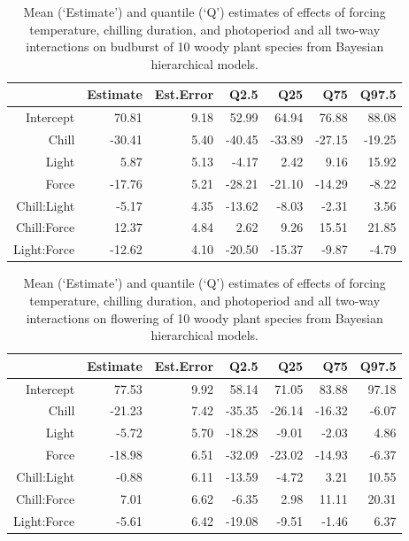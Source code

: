 \documentclass{article}\usepackage[]{graphicx}\usepackage[]{color}
\begin{document}
\begin{table}[ht]
\centering
\begin{tabular}{rrrrrrr}
  \hline
 & Estimate & Est.Error & Q2.5 & Q25 & Q75 & Q97.5 \\ 
  \hline
Intercept & 70.81 & 9.18 & 52.99 & 64.94 & 76.88 & 88.08 \\ 
  Chill & -30.41 & 5.40 & -40.45 & -33.89 & -27.15 & -19.25 \\ 
  Light & 5.87 & 5.13 & -4.17 & 2.42 & 9.16 & 15.92 \\ 
  Force & -17.76 & 5.21 & -28.21 & -21.10 & -14.29 & -8.22 \\ 
  Chill:Light & -5.17 & 4.35 & -13.62 & -8.03 & -2.31 & 3.56 \\ 
  Chill:Force & 12.37 & 4.84 & 2.62 & 9.26 & 15.51 & 21.85 \\ 
  Light:Force & -12.62 & 4.10 & -20.50 & -15.37 & -9.87 & -4.79 \\ 
   \hline
\end{tabular}
\caption{ Mean (`Estimate') and quantile (`Q') estimates of effects of forcing temperature, chilling duration, and photoperiod and all two-way interactions on budburst of 10 woody plant species from Bayesian hierarchical models.} 
\label{tab:modelests}
\end{table}
\begin{table}[ht]
\centering
\begin{tabular}{rrrrrrr}
  \hline
 & Estimate & Est.Error & Q2.5 & Q25 & Q75 & Q97.5 \\ 
  \hline
Intercept & 77.53 & 9.92 & 58.14 & 71.05 & 83.88 & 97.18 \\ 
  Chill & -21.23 & 7.42 & -35.35 & -26.14 & -16.32 & -6.07 \\ 
  Light & -5.72 & 5.70 & -18.28 & -9.01 & -2.03 & 4.86 \\ 
  Force & -18.98 & 6.51 & -32.09 & -23.02 & -14.93 & -6.37 \\ 
  Chill:Light & -0.88 & 6.11 & -13.59 & -4.72 & 3.21 & 10.55 \\ 
  Chill:Force & 7.01 & 6.62 & -6.35 & 2.98 & 11.11 & 20.31 \\ 
  Light:Force & -5.61 & 6.42 & -19.08 & -9.51 & -1.46 & 6.37 \\ 
   \hline
\end{tabular}
\caption{Mean (`Estimate') and quantile (`Q') estimates of effects of forcing temperature, chilling duration, and photoperiod and all two-way interactions on flowering of 10 woody plant species from Bayesian hierarchical models.} 
\label{tab:modelests2}
\end{table}
\end{document}
